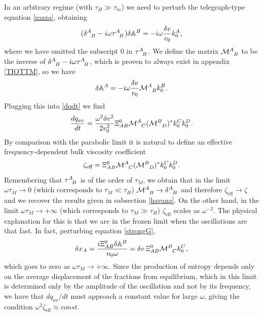 \documentclass[useAMS,usenatbib,prd,twocolumn,nofootinbib]{revtex4-1}
\begin{document}
In an arbitrary regime (with $\tau_H \gg \tau_m$) we need to perturb the telegraph-type equation 
\eqref{zazza}, obtaining
\begin{equation}
(\delta\indices{^A _B} - i \omega \tau\indices{^A _B})\delta \mathbb{A}^B = -i \omega  \dfrac{\delta v}{v_0} k_0^A,
\end{equation}
where we have omitted the subscript $0$ in $\tau\indices{^A _B}$. 
We define the matrix $\mathcal{M}\indices{^A _B}$ to be the inverse of $\delta\indices{^A _B} - i \omega \tau\indices{^A _B}$, which is proven to always exist in appendix \ref{TIOTTM}, so we have
\begin{equation}
\delta \mathbb{A}^A = -i \omega \dfrac{\delta v}{v_0} \mathcal{M}\indices{^A _B} k_0^B.
\end{equation}
Plugging this into \eqref{dqdt} we find
\begin{equation}
\dfrac{dq_{av}}{dt} = \dfrac{\omega^2 \delta v^2}{2 v_0^2} \Xi^0_{AB} \mathcal{M}\indices{^A _C} (\mathcal{M}\indices{^B _D})^* k_0^C k_0^D.
\end{equation}
By comparison with the parabolic limit it is natural to define an effective frequency-dependent bulk viscosity coefficient
\begin{equation}\label{bhuiop}
\zeta_{\textrm{eff}} = \Xi^0_{AB} \mathcal{M}\indices{^A _C} (\mathcal{M}\indices{^B _D})^* k_0^C k_0^D .
\end{equation}
Remembering that $\tau\indices{^A _B}$ is of the order of $\tau_M$, we obtain that in the limit $\omega \tau_M \rightarrow 0$ (which corresponds to $\tau_M \ll \tau_H$) $\mathcal{M}\indices{^A _B} \rightarrow \delta\indices{^A _B}$ and therefore $\zeta_{\textrm{eff}} \rightarrow \zeta$ and we recover the results given in subsection \ref{havana}. On the other hand, in the limit $\omega \tau_M \rightarrow +\infty$ (which corresponds to $\tau_M \gg \tau_H$) $\zeta_{\textrm{eff}}$ scales as $\omega^{-2}$. 
The physical explanation for this is that we are in the frozen limit when the oscillations are that fast. In fact, perturbing equation \eqref{strongG},
\begin{equation}
\delta x_A = \dfrac{i\Xi_{AB}^0 \delta \mathbb{A}^B}{n_0 \omega} = \delta v \, \Xi_{AB}^0 \mathcal{M}\indices{^B _C} k_0^C ,
\end{equation}
which goes to zero as $\omega \tau_M \rightarrow +\infty$. Since the production of entropy depends only on the average displacement of the fractions from equilibrium, which in this limit is determined only by the amplitude of the oscillation and not by its frequency, we have that $dq_{av}/dt$ must approach a constant value for large $\omega$, giving the condition $\omega^2 \zeta_{\textrm{eff}} \approx const$.
\end{document}
